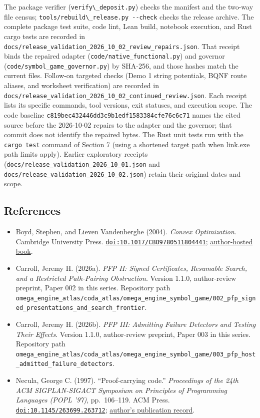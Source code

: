 \documentclass[
  11pt,
]{article}
\newcommand{\passthrough}[1]{#1}
\providecommand{\tightlist}{%
  \setlength{\itemsep}{0pt}\setlength{\parskip}{0pt}}
\begin{document}
The package verifier (\passthrough{\lstinline!verify\_deposit.py!})
checks the manifest and the two-way file census;
\passthrough{\lstinline!tools/rebuild\_release.py --check!} checks the
release archive. The complete package test suite, code lint, Lean build,
notebook execution, and Rust cargo tests are recorded in
\nolinkurl{docs/release_validation_2026_10_02_review_repairs.json}. That
receipt binds the repaired adapter
(\nolinkurl{code/native_functional.py}) and governor
(\nolinkurl{code/symbol_game_governor.py}) by SHA-256, and those hashes
match the current files. Follow-on targeted checks (Demo 1 string
potentials, BQNF route aliases, and worksheet verification) are recorded
in \nolinkurl{docs/release_validation_2026_10_02_continued_review.json}.
Each receipt lists its specific commands, tool versions, exit statuses,
and execution scope. The code baseline
\nolinkurl{c819bec432446dd3c9b1edf1583384cfe76c6c71} names the cited
source before the 2026-10-02 repairs to the adapter and the governor;
that commit does not identify the repaired bytes. The Rust unit tests
run with the \passthrough{\lstinline!cargo test!} command of Section 7
(using a shortened target path when link.exe path limits apply). Earlier
exploratory receipts
(\nolinkurl{docs/release_validation_2026_10_01.json} and
\nolinkurl{docs/release_validation_2026_10_02.json}) retain their
original dates and scope.

\subsection{References}\label{references}

\begin{itemize}
\tightlist
\item
  Boyd, Stephen, and Lieven Vandenberghe (2004). \emph{Convex
  Optimization}. Cambridge University Press.
  \href{https://doi.org/10.1017/CBO9780511804441}{\nolinkurl{doi:10.1017/CBO9780511804441}};
  \href{https://web.stanford.edu/~boyd/cvxbook/}{author-hosted book}.
\item
  Carroll, Jeremy H. (2026a). \emph{PFP II: Signed Certificates,
  Resumable Search, and a Restricted Path-Pairing Obstruction}. Version
  1.1.0, author-review preprint, Paper 002 in this series. Repository
  path
  \nolinkurl{omega_engine_atlas/coda_atlas/omega_engine_symbol_game/002_pfp_signed_presentations_and_search_frontier}.
\item
  Carroll, Jeremy H. (2026b). \emph{PFP III: Admitting Failure Detectors
  and Testing Their Effects}. Version 1.1.0, author-review preprint,
  Paper 003 in this series. Repository path
  \nolinkurl{omega_engine_atlas/coda_atlas/omega_engine_symbol_game/003_pfp_host_admitted_failure_detectors}.
\item
  Necula, George C. (1997). ``Proof-carrying code.'' \emph{Proceedings
  of the 24th ACM SIGPLAN-SIGACT Symposium on Principles of Programming
  Languages (POPL '97)}, pp.~106--119. ACM Press.
  \href{https://doi.org/10.1145/263699.263712}{\nolinkurl{doi:10.1145/263699.263712}};
  \href{https://people.eecs.berkeley.edu/~necula/papers.html}{author's
  publication record}.
\end{itemize}
\end{document}

